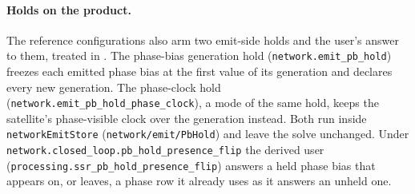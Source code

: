 \documentclass[main.tex]{subfiles}
\begin{document}
\paragraph{Holds on the product.}
The reference configurations also arm two emit-side holds and the user's
answer to them, treated in
.
The phase-bias generation hold (\texttt{network.emit\_pb\_hold}) freezes
each emitted phase bias at the first value of its generation and
declares every new generation. The phase-clock hold
(\texttt{network.emit\_pb\_hold\_phase\_clock}), a mode of the same hold,
keeps the satellite's phase-visible clock over the generation instead.
Both run inside \texttt{networkEmitStore}
(\texttt{network/emit/PbHold}) and leave the solve unchanged. Under
\texttt{network.closed\_loop.pb\_hold\_presence\_flip} the derived user
(\texttt{processing.ssr\_pb\_hold\_presence\_flip}) answers a held phase
bias that appears on, or leaves, a phase row it already uses as it
answers an unheld one.

\ifSubfilesClassLoaded{\printbibliography}{}
\end{document}
